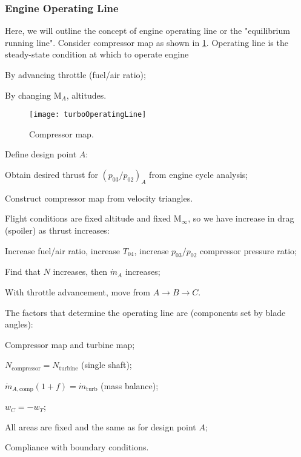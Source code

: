 \subsubsection{Engine Operating Line}
Here, we will outline the concept of engine operating line or the "equilibrium running line". Consider compressor map as shown in \cref{fig:operatingLine}. Operating line is the steady-state condition at which to operate engine
\begin{itemizePacked}
\item By advancing throttle (fuel/air ratio);
\item By changing M$_A$, altitudes.
\end{itemizePacked}

\begin{figure}[!htb!]
 \centering
    {\texttt{[image: turboOperatingLine]}}
    \caption{\label{fig:operatingLine}Compressor map.}
\end{figure}

Define design point $A$:
\begin{itemizePacked}
\item Obtain desired thrust for $(p_{03}/p_{02})_A$ from engine cycle analysis;
\item Construct compressor map from velocity triangles.
\end{itemizePacked}

Flight conditions are fixed altitude and fixed M$_\infty$, so we have increase in drag (spoiler) as thrust increases:
\begin{itemizePacked}
\item Increase fuel/air ratio, increase $T_{04}$, increase $p_{03}/p_{02}$ compressor pressure ratio;
\item Find that $N$ increases, then $\dot{m}_A$ increases;
\item With throttle advancement, move from $A \rightarrow B \rightarrow C$.
\end{itemizePacked}

The factors that determine the operating line are (components set by blade angles):
\begin{itemizePacked}
\item Compressor map and turbine map;
\item $N_\text{compressor} = N_\text{turbine}$ (single shaft);
\item $\dot{m}_{A,\text{comp}}(1+f) = \dot{m}_\text{turb}$ (mass balance);
\item $w_C = - w_T$;
\item All areas are fixed and the same as for design point $A$;
\item Compliance with boundary conditions.
\end{itemizePacked}

